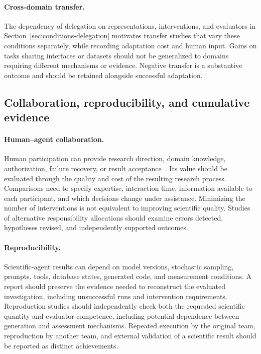 \paragraph{Cross-domain transfer.}
The dependency of delegation on representations, interventions, and evaluators in Section~\ref{sec:conditions-delegation} motivates transfer studies that vary these conditions separately, while recording adaptation cost and human input. Gains on tasks sharing interfaces or datasets should not be generalized to domains requiring different mechanisms or evidence. Negative transfer is a substantive outcome and should be retained alongside successful adaptation.

\subsection{Collaboration, reproducibility, and cumulative evidence}

\paragraph{Human--agent collaboration.}
Human participation can provide research direction, domain knowledge, authorization, failure recovery, or result acceptance~\cite{asd0001,asd0054,asd0624}. Its value should be evaluated through the quality and cost of the resulting research process. Comparisons need to specify expertise, interaction time, information available to each participant, and which decisions change under assistance. Minimizing the number of interventions is not equivalent to improving scientific quality. Studies of alternative responsibility allocations should examine errors detected, hypotheses revised, and independently supported outcomes.

\paragraph{Reproducibility.}
Scientific-agent results can depend on model versions, stochastic sampling, prompts, tools, database states, generated code, and measurement conditions. A report should preserve the evidence needed to reconstruct the evaluated investigation, including unsuccessful runs and intervention requirements. Reproduction studies should independently check both the requested scientific quantity and evaluator competence, including potential dependence between generation and assessment mechanisms. Repeated execution by the original team, reproduction by another team, and external validation of a scientific result should be reported as distinct achievements.

